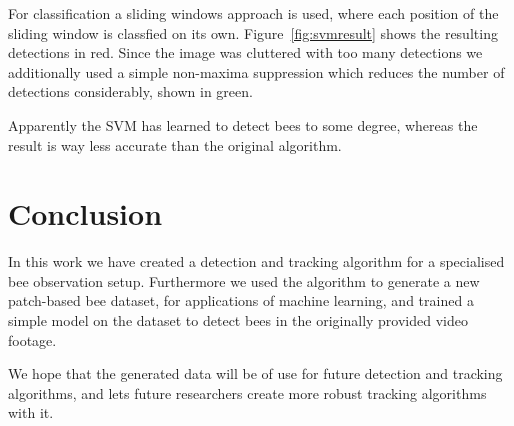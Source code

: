 \documentclass[10pt,a4paper]{article}
\begin{document}
For classification a sliding windows approach is used, where each position of the sliding window is classfied on its own. Figure~\ref{fig:svmresult} shows the resulting detections in red. Since the image was cluttered with too many detections we additionally used a simple non-maxima suppression which reduces the number of detections considerably, shown in green.

Apparently the SVM has learned to detect bees to some degree, whereas the result is way less accurate than the original algorithm. 

\section{Conclusion}
In this work we have created a detection and tracking algorithm for a specialised bee observation setup. Furthermore we used the algorithm to generate a new patch-based bee dataset, for applications of machine learning, and trained a simple model on the dataset to detect bees in the originally provided video footage.

We hope that the generated data will be of use for future detection and tracking algorithms, and lets future researchers create more robust tracking algorithms with it.



\end{document}
